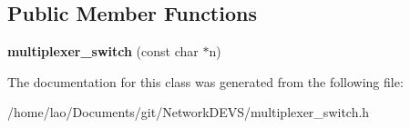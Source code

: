 \subsection*{Public Member Functions}
\begin{DoxyCompactItemize}
\item 
{\bfseries multiplexer\+\_\+switch} (const char $\ast$n)\hypertarget{classmultiplexer__switch_a65f29980d531ee7d46506763ac9631c1}{}\label{classmultiplexer__switch_a65f29980d531ee7d46506763ac9631c1}

\end{DoxyCompactItemize}


The documentation for this class was generated from the following file\+:\begin{DoxyCompactItemize}
\item 
/home/lao/\+Documents/git/\+Network\+D\+E\+V\+S/multiplexer\+\_\+switch.\+h\end{DoxyCompactItemize}
